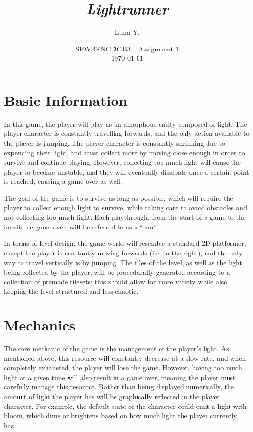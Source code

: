\documentclass[10pt]{article}
\begin{document}
\title{\textit{Lightrunner}}
\author{Luna Y.}
\date{
    SFWRENG 3GB3 -- Assignment 1\\[0.25cm]
    \today
}
\maketitle

\tableofcontents

\section{Basic Information}

In this game, the player will play as an amorphous entity composed of light. The player character is constantly travelling forwards,
and the only action available to the player is jumping. The player character is constantly shrinking due to expending their light,
and must collect more by moving close enough in order to survive and continue playing. However, collecting too much light will
cause the player to become unstable, and they will eventually dissipate once a certain point is reached, causing a game over as well.

The goal of the game is to survive as long as possible, which will require the player to collect enough light to survive,
while taking care to avoid obstacles and not collecting too much light. Each playthrough, from the start of a game to the inevitable game over,
will be referred to as a ``run''.

In terms of level design, the game world will resemble a standard 2D platformer, except the player is constantly moving forwards (i.e. to the right),
and the only way to travel vertically is by jumping. The tiles of the level, as well as the light being collected by the player,
will be procedurally generated according to a collection of premade tilesets; this should allow for more variety while also keeping
the level structured and less chaotic.

\section{Mechanics}

The core mechanic of the game is the management of the player's light. As mentioned above, this resource will constantly decrease at a slow rate,
and when completely exhausted, the player will lose the game. However, having too much light at a given time will also result in a game over,
meaning the player must carefully manage this resource. Rather than being displayed numerically, the amount of light the player has will be
graphically reflected in the player character. For example, the default state of the character could emit a light with bloom, which dims
or brightens based on how much light the player currently has.
\end{document}
